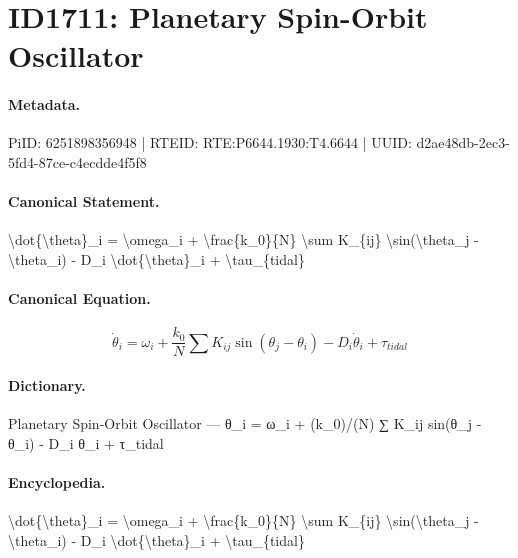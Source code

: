 \section*{ID1711: Planetary Spin-Orbit Oscillator}
\paragraph{Metadata.}
PiID: 6251898356948 | RTEID: RTE:P6644.1930:T4.6644 | UUID: d2ae48db-2ec3-5fd4-87ce-c4ecdde4f5f8

\paragraph{Canonical Statement.}
\textbackslash{}dot\{\textbackslash{}theta\}\_i = \textbackslash{}omega\_i + \textbackslash{}frac\{k\_0\}\{N\} \textbackslash{}sum K\_\{ij\} \textbackslash{}sin(\textbackslash{}theta\_j - \textbackslash{}theta\_i) - D\_i \textbackslash{}dot\{\textbackslash{}theta\}\_i + \textbackslash{}tau\_\{tidal\}

\paragraph{Canonical Equation.}
\[
\dot{\theta}_i = \omega_i + \frac{k_0}{N} \sum K_{ij} \sin(\theta_j - \theta_i) - D_i \dot{\theta}_i + \tau_{tidal}
\]

\paragraph{Dictionary.}
Planetary Spin-Orbit Oscillator — θ\_i = ω\_i + (k\_0)/(N) ∑ K\_ij sin(θ\_j - θ\_i) - D\_i θ\_i + τ\_tidal

\paragraph{Encyclopedia.}
\textbackslash{}dot\{\textbackslash{}theta\}\_i = \textbackslash{}omega\_i + \textbackslash{}frac\{k\_0\}\{N\} \textbackslash{}sum K\_\{ij\} \textbackslash{}sin(\textbackslash{}theta\_j - \textbackslash{}theta\_i) - D\_i \textbackslash{}dot\{\textbackslash{}theta\}\_i + \textbackslash{}tau\_\{tidal\}
